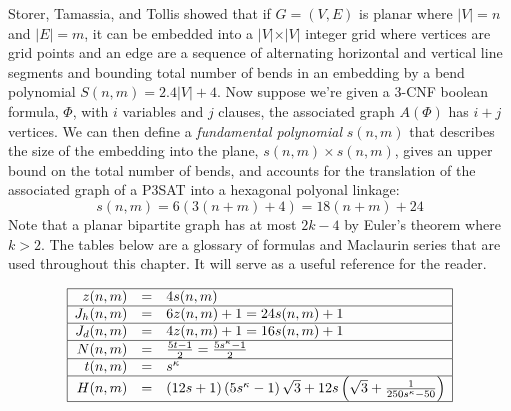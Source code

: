 \documentclass[10pt]{CSUNthesis}
\theoremstyle{plain}%
\theoremstyle{definition}
\theoremstyle{remark}
\newcommand{\lr}[1]{\left( #1 \right)}
\newcommand{\vlr}[1]{\left\vert #1 \right\vert}
\begin{document}
Storer, Tamassia, and Tollis \cite{storer1984minimal,tamassia1987efficient} showed that if $G=(V,E)$ is planar where $\vlr{V}=n$ and $\vlr{E} = m$, it can be embedded into a $\vert V \vert \times \vert V \vert$ integer grid where vertices are grid points and an edge are a sequence of alternating horizontal and vertical line segments and bounding total number of bends in an embedding by a bend polynomial $S(n,m)=2.4 \vert V\vert + 4$.  
Now suppose we're given a 3-CNF boolean formula, $\Phi$, with $i$ variables and $j$ clauses, the associated graph $A(\Phi)$ has $i+j$ vertices.  
We can then define a \textit{fundamental polynomial} $s(n,m)$ that describes the size of the embedding into the plane, $s(n,m) \times s(n,m)$, gives an upper bound on the total number of bends, and accounts for the translation of the associated graph of a P3SAT into a hexagonal polyonal linkage:
$$s(n,m) = 6\lr{3 (n+m) + 4} = 18 (n+m) + 24$$
Note that a planar bipartite graph has at most $2k-4$ by Euler's theorem where $k>2$.  
The tables below are a glossary of formulas and Maclaurin series that are used throughout this chapter.
It will serve as a useful reference for the reader.

$$
\begin{array}{|rcl|}
\hline
z(n,m)		&=& 4 s(n,m)\\\hline
J_h (n,m) 	&=& 6z(n,m)+1 = 24s(n,m)+1 \\\hline
J_d (n,m) 	&=& 4z(n,m)+1												= 16s(n,m)+1  			\\\hline
N(n,m)		&=& \frac{5t-1}{2}											= \frac{5s^\kappa-1}{2}	\\\hline
t(n,m)		&=& s^\kappa																		\\\hline
H(n,m) 		&=&  (12s+1)  \lr{5s^\kappa -1}  \sqrt{3} + 12s \lr{\sqrt{3}+ \frac{1}{250s^\kappa -50}}				\\\hline
\end{array}
$$
\end{document}
